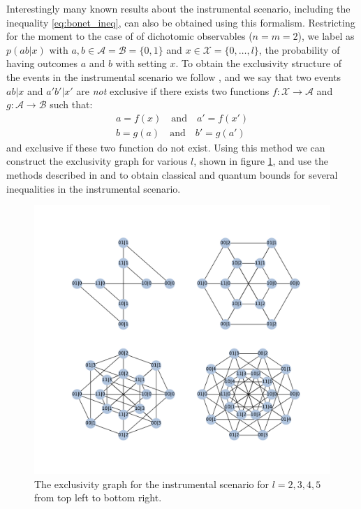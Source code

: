 \documentclass[floatfix, twocolumn, aps, prl]{revtex4-1}
\begin{document}
Interestingly many known results about the instrumental scenario, including the
inequality \eqref{eq:bonet_ineq}, can also be obtained using this formalism.
Restricting for the moment to the case of of dichotomic observables ($n=m=2$),
we label as $p(ab|x)$ with $a, b \in \mathcal{A} = \mathcal{B} = \{0,1\}$ and $x \in
\mathcal{X} = \{0,\ldots,l\}$, the probability of having outcomes $a$ and $b$ with setting $x$. 
To obtain the exclusivity structure of the events in the instrumental scenario
we follow \cite{bonet2001}, and we say that two events $ab|x$ and $a'b'|x'$ are \emph{not} exclusive
if there exists two functions $f:\mathcal{X} \rightarrow \mathcal{A}$ and
$g:\mathcal{A} \rightarrow \mathcal{B}$ such that:
\begin{align}
    a = f(x) \quad\text{and}\quad a'=f(x')\\
    b = g(a) \quad\text{and}\quad b'=g(a')
    \label{eq:non_exclusivity_condition}
\end{align}
and exclusive if these two function do not exist.
Using this method we can construct the exclusivity graph for various $l$,
shown in figure \ref{fig:instrumental_exgraphs}, and use the methods described
in \cite{cabello2014} and \cite{rabelo2014} to obtain classical and quantum
bounds for several inequalities in the instrumental scenario. 
\begin{figure}[h]
    \centering
    \includegraphics[width=.9\textwidth]{images/instrumental_exgraph.pdf}
    \caption{The exclusivity graph for the instrumental scenario for $l=2,3,4,5$
    from top left to bottom right.}
    \label{fig:instrumental_exgraphs}
\end{figure}
\end{document}
